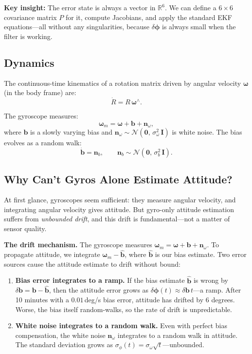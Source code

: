 \documentclass[11pt,letterpaper]{article}
\newcommand{\R}{\mathbb{R}}
\newcommand{\eye}{\mathbf{I}}
\begin{document}
\textbf{Key insight:}  The error state is always a vector in
$\R^{6}$.  We can define a $6 \times 6$ covariance matrix $P$ for
it, compute Jacobians, and apply the standard EKF equations---all
without any singularities, because $\delta\bm{\phi}$ is always
small when the filter is working.

\subsection{Dynamics}

The continuous-time kinematics of a rotation matrix driven by
angular velocity $\bm{\omega}$ (in the body frame) are:
\[
  \dot{R} = R\,\bm{\omega}^{\wedge}.
\]

The gyroscope measures:
\[
  \bm{\omega}_m = \bm{\omega} + \mathbf{b} + \mathbf{n}_{\omega},
\]
where $\mathbf{b}$ is a slowly varying bias and
$\mathbf{n}_{\omega} \sim \mathcal{N}(\mathbf{0},\,
\sigma_{\omega}^{2}\,\eye)$ is white noise.  The bias evolves as a
random walk:
\[
  \dot{\mathbf{b}} = \mathbf{n}_{b},
  \qquad
  \mathbf{n}_{b} \sim \mathcal{N}(\mathbf{0},\,
  \sigma_{b}^{2}\,\eye).
\]

\subsection{Why Can't Gyros Alone Estimate Attitude?}

At first glance, gyroscopes seem sufficient: they measure angular
velocity, and integrating angular velocity gives attitude.  But
gyro-only attitude estimation suffers from \emph{unbounded drift},
and this drift is fundamental---not a matter of sensor quality.

\textbf{The drift mechanism.}  The gyroscope measures
$\bm{\omega}_m = \bm{\omega} + \mathbf{b} + \mathbf{n}_{\omega}$.
To propagate attitude, we integrate $\bm{\omega}_m - \hat{\mathbf{b}}$,
where $\hat{\mathbf{b}}$ is our bias estimate.  Two error sources
cause the attitude estimate to drift without bound:

\begin{enumerate}[nosep]
  \item \textbf{Bias error integrates to a ramp.}  If the bias
    estimate $\hat{\mathbf{b}}$ is wrong by
    $\delta\mathbf{b} = \mathbf{b} - \hat{\mathbf{b}}$, then the
    attitude error grows as
    $\delta\bm{\phi}(t) \approx \delta\mathbf{b}\,t$---a ramp.
    After 10 minutes with a $0.01$\,deg/s bias error, attitude
    has drifted by $6$ degrees.  Worse, the bias itself
    random-walks, so the rate of drift is unpredictable.
  \item \textbf{White noise integrates to a random walk.}  Even with
    perfect bias compensation, the white noise
    $\mathbf{n}_{\omega}$ integrates to a random walk in attitude.
    The standard deviation grows as
    $\sigma_{\phi}(t) = \sigma_{\omega}\sqrt{t}$---unbounded.
\end{enumerate}
\end{document}
